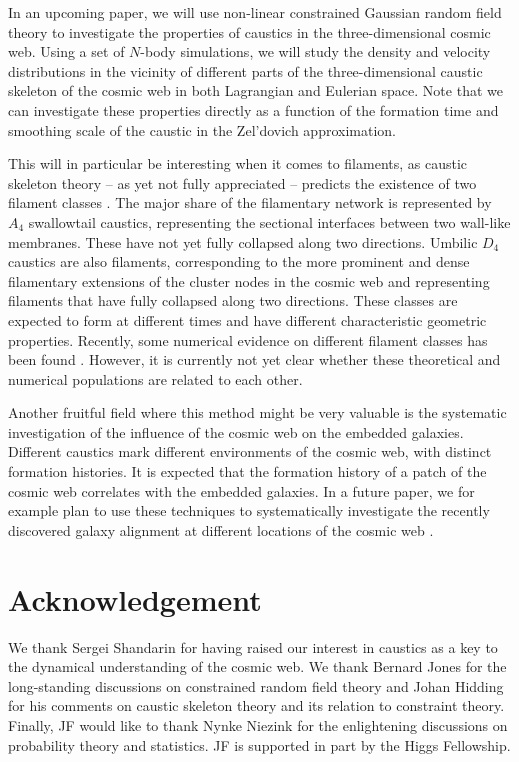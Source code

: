 \documentclass[a4paper, 11pt]{article}
\begin{document}
In an upcoming paper, we will use non-linear constrained Gaussian random field theory to investigate the properties of caustics in the three-dimensional cosmic web. Using a set of $N$-body simulations, we will study the density and velocity distributions in the vicinity of different parts of the three-dimensional caustic skeleton of the cosmic web in both Lagrangian and Eulerian space. Note that we can investigate these properties directly as a function of the formation time and smoothing scale of the caustic in the Zel'dovich approximation. 

This will in particular be interesting when it comes to filaments, as caustic skeleton theory -- as yet not fully appreciated -- predicts the existence of two filament classes \cite{Feldbrugge:2018}. The major share of the filamentary network is represented by $A_4$ swallowtail caustics, representing the sectional interfaces between two wall-like membranes. These have not yet fully collapsed along two directions. Umbilic $D_4$ caustics are also filaments, corresponding to the more prominent and dense filamentary extensions of the cluster nodes in the cosmic web and representing filaments that have fully collapsed along two directions. These classes are expected to form at different times and have different characteristic geometric properties. Recently, some numerical evidence on different filament classes has been found \cite{Galarraga-Espinosa:2020}. However, it is currently not yet clear whether these theoretical and numerical populations are related to each other.

Another fruitful field where this method might be very valuable is the systematic investigation of the influence of the cosmic web on the embedded galaxies. Different caustics mark different environments of the cosmic web, with distinct formation histories. It is expected that the formation history of a patch of the cosmic web correlates with the embedded galaxies. In a future paper, we for example plan to use these techniques to systematically investigate the recently discovered galaxy alignment at different locations of the cosmic web \cite{Aragon:2007, Ganeshaiah:2018, Ganeshaiah:2019, Hellwing:2021,Lopez:2021,Ganeshaiah:2021}.

\section*{Acknowledgement}
We thank Sergei Shandarin for having raised our interest in caustics as a key to the dynamical understanding of the cosmic web. We thank Bernard Jones for the long-standing discussions on constrained random field theory and Johan Hidding for his comments on caustic skeleton theory and its relation to constraint theory. Finally, JF would like to thank Nynke Niezink for the enlightening discussions on probability theory and statistics. JF is supported in part by the Higgs Fellowship.
\end{document}

